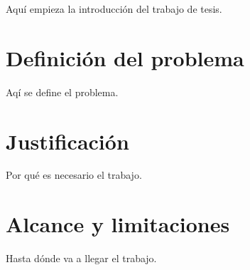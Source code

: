 Aquí empieza la introducci\'on del trabajo de tesis.

\section{Definición del problema}

Aq\'i se define el problema.

\section{Justificaci\'on}

Por qué es necesario el trabajo.

\section{Alcance y limitaciones}

Hasta dónde va a llegar el trabajo.